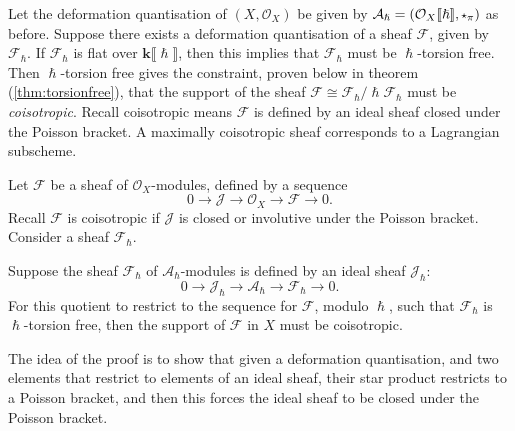     
    Let the deformation quantisation of \((X,\mathcal{O}_X)\) be given by \( \mathcal{A}_\hslash = ( \mathcal{O}_X \lBrack \hslash \rBrack, \starp_{\pi} )  \) as before. Suppose there exists a deformation quantisation of a sheaf \( \mathcal{F}\), given by \( \mathcal{F}_{\hslash}\).
    If \( \mathcal{F}_\hslash \) is flat over \( \mathbf{k} \lBrack \hslash \rBrack \), then this implies that \( \mathcal{F}_{\hslash}\) must be \( \hslash\)-torsion free. Then \(\hslash\)-torsion free gives the constraint, proven below in theorem (\ref{thm:torsionfree}), that the support of the sheaf \(\mathcal{F} \cong \mathcal{F}_{\hslash}/\hslash \mathcal{F}_{\hslash}\) must be \emph{coisotropic}. Recall coisotropic means \( \mathcal{F}\) is defined by an ideal sheaf closed under the Poisson bracket. A maximally coisotropic sheaf corresponds to a Lagrangian subscheme.
   
    Let \( \mathcal{F}\) be a sheaf of \(\mathcal{O}_X \)-modules, defined by a sequence
    \[  0 \rightarrow \mathcal{J} \rightarrow \mathcal{O}_X \rightarrow \mathcal{F} \rightarrow 0. \]
    Recall \( \mathcal{F}\) is coisotropic if \(\mathcal{J}\) is closed or involutive under the Poisson bracket.
    Consider a sheaf \( \mathcal{F}_{\hslash}\). 
    \begin{thm} \label{thm:torsionfree} 
    Suppose the sheaf \( \mathcal{F}_{\hslash}\) of \(\mathcal{A}_{\hslash} \)-modules is defined by an ideal sheaf \( \mathcal{J}_{\hslash} \):
    \[ 0 \rightarrow \mathcal{J}_{\hslash} \rightarrow \mathcal{A}_\hslash \rightarrow \mathcal{F}_{\hslash} \rightarrow 0. \]
    For this quotient to restrict to the sequence for \( \mathcal{F}\), modulo \( \hslash\), such that \( \mathcal{F}_{\hslash}\) is \(\hslash\)-torsion free, then the support of \( \mathcal{F}\) in \(X\) must be coisotropic.
    \end{thm}

    The idea of the proof is to show that given a deformation quantisation, and two elements that restrict to elements of an ideal sheaf, their star product restricts to a Poisson bracket, and then this forces the ideal sheaf to be closed under the Poisson bracket. 

